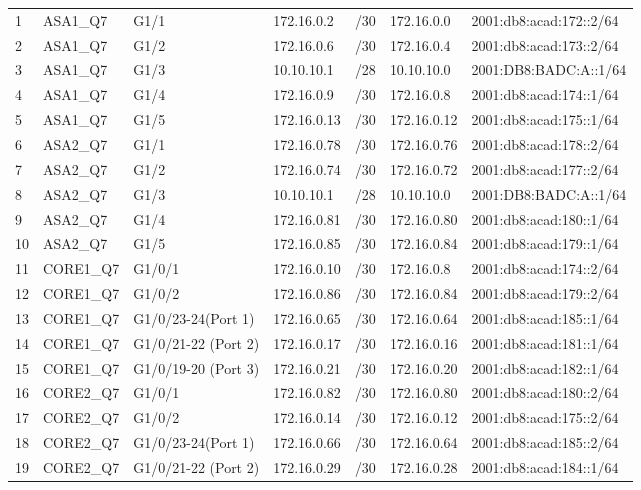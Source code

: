 \documentclass[a4paper, 12pt]{article}
\begin{document}
\begin{center}
\begin{longtable}{|p{}|p{}|p{}|p{}|p{}|p{}|p{}|}
    
    \endlastfoot
        \hline  \multicolumn{7}{|c|}{I/QUẬN 7} \\
        \hline 1 &	ASA1\_Q7	&G1/1	&172.16.0.2	&/30	&172.16.0.0	&2001:db8:acad:172::2/64\\
        \hline 2 &	ASA1\_Q7	&G1/2	&172.16.0.6	&/30	&172.16.0.4	&2001:db8:acad:173::2/64\\
        \hline 3 &	ASA1\_Q7	&G1/3	&10.10.10.1	&/28	&10.10.10.0	&2001:DB8:BADC:A::1/64\\
        \hline 4 &	ASA1\_Q7	&G1/4	&172.16.0.9	&/30	&172.16.0.8	&2001:db8:acad:174::1/64\\
        \hline 5 &	ASA1\_Q7	&G1/5	&172.16.0.13	&/30	&172.16.0.12	&2001:db8:acad:175::1/64\\
        \hline 6 &	ASA2\_Q7	&G1/1	&172.16.0.78	&/30	&172.16.0.76	&2001:db8:acad:178::2/64\\
        \hline 7 &	ASA2\_Q7	&G1/2	&172.16.0.74	&/30	&172.16.0.72	&2001:db8:acad:177::2/64\\
        \hline 8 &	ASA2\_Q7	&G1/3	&10.10.10.1	&/28	&10.10.10.0	&2001:DB8:BADC:A::1/64\\
        \hline 9 &	ASA2\_Q7	&G1/4	&172.16.0.81	&/30	&172.16.0.80	&2001:db8:acad:180::1/64\\
        \hline 10 &	ASA2\_Q7	&G1/5	&172.16.0.85	&/30	&172.16.0.84	&2001:db8:acad:179::1/64\\
        \hline 11 &	CORE1\_Q7	&G1/0/1	&172.16.0.10	&/30	&172.16.0.8	&2001:db8:acad:174::2/64\\
        \hline 12 &	CORE1\_Q7	&G1/0/2	&172.16.0.86	&/30	&172.16.0.84	&2001:db8:acad:179::2/64\\
        \hline 13 &	CORE1\_Q7	&G1/0/23-24(Port 1)	&172.16.0.65	&/30	&172.16.0.64	&2001:db8:acad:185::1/64\\
        \hline 14 &	CORE1\_Q7	&G1/0/21-22 (Port 2)	&172.16.0.17	&/30	&172.16.0.16	&2001:db8:acad:181::1/64\\
        \hline 15 &	CORE1\_Q7	&G1/0/19-20 (Port 3)	&172.16.0.21	&/30	&172.16.0.20	&2001:db8:acad:182::1/64\\
        \hline 16 &	CORE2\_Q7	&G1/0/1	&172.16.0.82	&/30	&172.16.0.80	&2001:db8:acad:180::2/64\\
        \hline 17 &	CORE2\_Q7	&G1/0/2	&172.16.0.14	&/30	&172.16.0.12	&2001:db8:acad:175::2/64\\
        \hline 18 &	CORE2\_Q7	&G1/0/23-24(Port 1)	&172.16.0.66	&/30	&172.16.0.64	&2001:db8:acad:185::2/64\\
        \hline 19 &	CORE2\_Q7	&G1/0/21-22 (Port 2)	&172.16.0.29	&/30	&172.16.0.28	&2001:db8:acad:184::1/64\\

\end{longtable}
\end{center}
\end{document}
